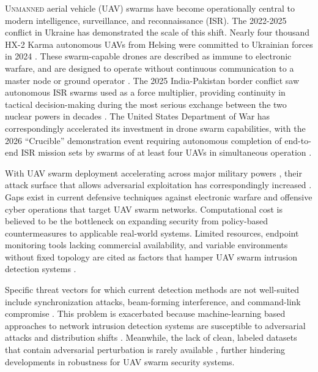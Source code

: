 \documentclass[conf]{new-aiaa}
\begin{document}
\lettrine{U}{nmanned} aerial vehicle (UAV) swarms have become operationally central to modern intelligence, surveillance, and reconnaissance (ISR). The 2022-2025 conflict in Ukraine has demonstrated the scale of this shift. Nearly four thousand HX-2 Karma autonomous UAVs from Helsing were committed to Ukrainian forces in 2024 \cite{Bendett}. These swarm-capable drones are described as immune to electronic warfare, and are designed to operate without continuous communication to a master node or ground operator \cite{Helsing}. The 2025 India-Pakistan border conflict saw autonomous ISR swarms used as a force multiplier, providing continuity in tactical decision-making during the most serious exchange between the two nuclear powers in decades \cite{Sareen}. The United States Department of War has correspondingly accelerated its investment in drone swarm capabilities, with the 2026 ``Crucible'' demonstration event requiring autonomous completion of end-to-end ISR mission sets by swarms of at least four UAVs in simultaneous operation \cite{Harper}.

With UAV swarm deployment accelerating across major military powers \cite{Bendett, Sareen, Harper}, their attack surface that allows adversarial exploitation has correspondingly increased \cite{Rugo}. Gaps exist in current defensive techniques against electronic warfare and offensive cyber operations that target UAV swarm networks. Computational cost is believed to be the bottleneck on expanding security from policy-based countermeasures to applicable real-world systems. Limited resources, endpoint monitoring tools lacking commercial availability, and variable environments without fixed topology are cited as factors that hamper UAV swarm intrusion detection systems \cite{Rugo}.

Specific threat vectors for which current detection methods are not well-suited include synchronization attacks, beam-forming interference, and command-link compromise \cite{Cevik}. This problem is exacerbated because machine-learning based approaches to network intrusion detection systems are susceptible to adversarial attacks and distribution shifts \cite{Wang}. Meanwhile, the lack of clean, labeled datasets that contain adversarial perturbation is rarely available \cite{KacemBenjamin}, further hindering developments in robustness for UAV swarm security systems.
\end{document}
